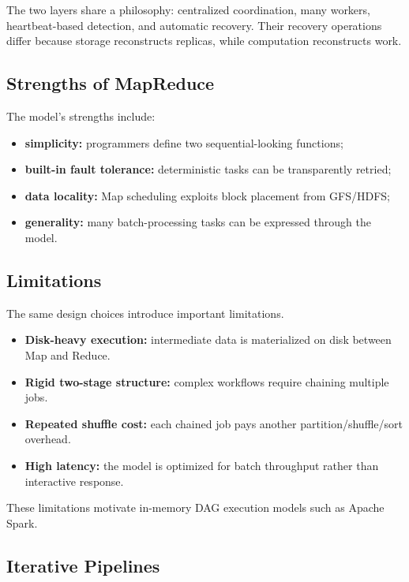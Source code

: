 \documentclass[11pt,a4paper,oneside]{book}
\begin{document}
The two layers share a philosophy: centralized coordination, many workers, heartbeat-based detection, and automatic recovery. Their recovery operations differ because storage reconstructs replicas, while computation reconstructs work.

\subsection{Strengths of MapReduce}

The model's strengths include:

\begin{itemize}
    \item \textbf{simplicity:} programmers define two sequential-looking functions;
    \item \textbf{built-in fault tolerance:} deterministic tasks can be transparently retried;
    \item \textbf{data locality:} Map scheduling exploits block placement from GFS/HDFS;
    \item \textbf{generality:} many batch-processing tasks can be expressed through the model.
\end{itemize}

\subsection{Limitations}

The same design choices introduce important limitations.

\begin{itemize}
    \item \textbf{Disk-heavy execution:} intermediate data is materialized on disk between Map and Reduce.
    \item \textbf{Rigid two-stage structure:} complex workflows require chaining multiple jobs.
    \item \textbf{Repeated shuffle cost:} each chained job pays another partition/shuffle/sort overhead.
    \item \textbf{High latency:} the model is optimized for batch throughput rather than interactive response.
\end{itemize}

These limitations motivate in-memory DAG execution models such as Apache Spark.

\subsection{Iterative Pipelines}
\end{document}
